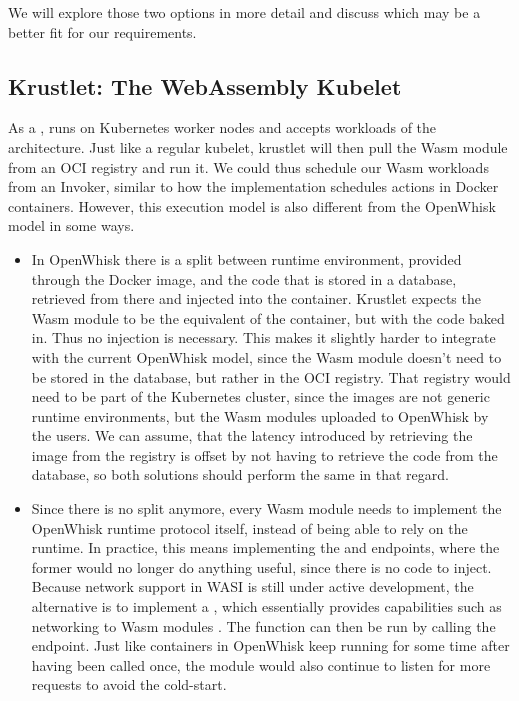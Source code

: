 We will explore those two options in more detail and discuss which may be a better fit for our requirements.

\subsection{Krustlet: The WebAssembly Kubelet}

As a ,  runs on Kubernetes worker nodes and accepts workloads of the  architecture. Just like a regular kubelet, krustlet will then pull the Wasm module from an OCI registry and run it. We could thus schedule our Wasm workloads from an Invoker, similar to how the  implementation schedules actions in Docker containers. However, this execution model is also different from the OpenWhisk model in some ways.

\begin{itemize}
    \item In OpenWhisk there is a split between runtime environment, provided through the Docker image, and the code that is stored in a database, retrieved from there and injected into the container. Krustlet expects the Wasm module to be the equivalent of the container, but with the code baked in. Thus no injection is necessary. This makes it slightly harder to integrate with the current OpenWhisk model, since the Wasm module doesn't need to be stored in the database, but rather in the OCI registry. That registry would need to be part of the Kubernetes cluster, since the images are not generic runtime environments, but the Wasm modules uploaded to OpenWhisk by the users. We can assume, that the latency introduced by retrieving the image from the registry is offset by not having to retrieve the code from the database, so both solutions should perform the same in that regard.
    \item Since there is no split anymore, every Wasm module needs to implement the OpenWhisk runtime protocol itself, instead of being able to rely on the runtime. In practice, this means implementing the  and  endpoints, where the former would no longer do anything useful, since there is no code to inject. Because network support in WASI is still under active development, the alternative is to implement a , which essentially provides capabilities such as networking to Wasm modules \cite{WC2021}. The function can then be run by calling the  endpoint. Just like containers in OpenWhisk keep running for some time after having been called once, the module would also continue to listen for more requests to avoid the cold-start.
\end{itemize}

